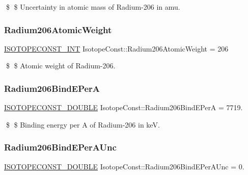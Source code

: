 \$ \$ Uncertainty in atomic mass of Radium-\/206 in amu. \mbox{\label{group___isotope_const-_radium-_ra206_gae7a5c8861c1ee1607f31058204b2b57c}} 
\subsubsection{\texorpdfstring{Radium206\+Atomic\+Weight}{Radium206AtomicWeight}}
{\footnotesize\ttfamily \mbox{\hyperlink{group___isotope_const-_macros_ga5f18360b3e99483a35c32d789e62621c}{I\+S\+O\+T\+O\+P\+E\+C\+O\+N\+S\+T\+\_\+\+I\+NT}} Isotope\+Const\+::\+Radium206\+Atomic\+Weight = 206}

\$ \$ Atomic weight of Radium-\/206. \mbox{\label{group___isotope_const-_radium-_ra206_ga986cf988144a3d37e677800ae38bf98e}} 
\subsubsection{\texorpdfstring{Radium206\+Bind\+E\+PerA}{Radium206BindEPerA}}
{\footnotesize\ttfamily \mbox{\hyperlink{group___isotope_const-_macros_ga8f45a7272ce02c0b4c65c44636ed719a}{I\+S\+O\+T\+O\+P\+E\+C\+O\+N\+S\+T\+\_\+\+D\+O\+U\+B\+LE}} Isotope\+Const\+::\+Radium206\+Bind\+E\+PerA = 7719.}

\$ \$ Binding energy per A of Radium-\/206 in keV. \mbox{\label{group___isotope_const-_radium-_ra206_ga314d756919a49e34078be96c342d828c}} 
\subsubsection{\texorpdfstring{Radium206\+Bind\+E\+Per\+A\+Unc}{Radium206BindEPerAUnc}}
{\footnotesize\ttfamily \mbox{\hyperlink{group___isotope_const-_macros_ga8f45a7272ce02c0b4c65c44636ed719a}{I\+S\+O\+T\+O\+P\+E\+C\+O\+N\+S\+T\+\_\+\+D\+O\+U\+B\+LE}} Isotope\+Const\+::\+Radium206\+Bind\+E\+Per\+A\+Unc = 0.}

